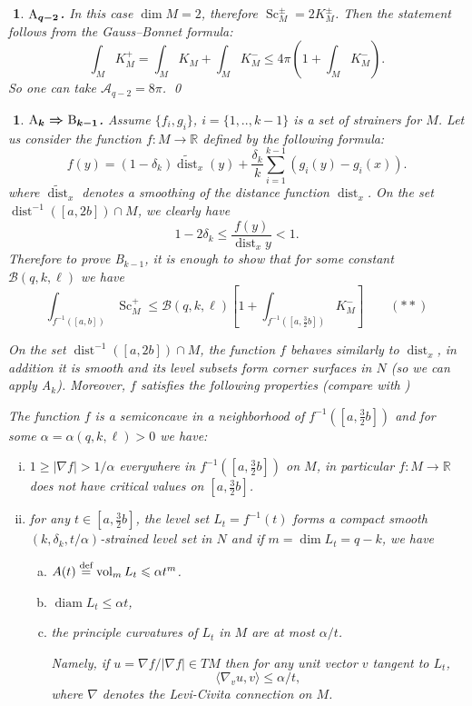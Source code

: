 \documentclass{article}
\def\RR{\mathbb{R}}
\def\cA{{\mathcal A}}
\def\cB{{\mathcal B}}
\def\ge{\geqslant}
\def\le{\leqslant}
\def\l{\left}
\def\r{\right}
\def\<{\langle}
\def\>{\rangle}
\def\vol{\operatorname{vol}}
\def\diam{\operatorname{diam}}
\def\dim{\operatorname{dim}}
\def\dist{\operatorname{dist}}
\def\Sc{\operatorname{Sc}}
\newtheorem{Nothing}[thm]{$\!\!\!$}
\newenvironment{nothing}{\begin{Nothing}\rm}{\end{Nothing}}
\begin{document}
\begin{nothing}{\bf $\boldmath{\text{A}_{q-2}}$.}
In this case $\dim M=2$, therefore $\Sc_M^\pm=2K_M^\pm$.
Then the statement follows from the Gauss--Bonnet formula:
$$\int_M K_M^+=\int_M K_M+ \int_M K_M^-\le 4\pi\l(1+\int_M K_M^-\r).$$
So one can take $\cA_{q-2}=8\pi$.
\qed
\end{nothing}

\begin{nothing}{\bf$\boldmath{\text{A}_{k}\Rightarrow\text{B}_{k-1}}$.} Assume $\{f_i,g_i\}$, $i=\{1,..,k-1\}$ is a set of strainers for $M$.
Let us consider the function $f:M\to \RR$ defined by the following formula:
$$f(y)=(1-\delta_k)\widetilde{\dist}_x(y)
+
\frac{\delta_k}k \sum_{i=1}^{k-1}(g_i(y)-g_i(x)).$$
where $\widetilde{\dist}_x$ denotes a smoothing of the distance function ${\dist}_x$.
On the set $\dist^{-1}([a,2b])\cap M$, we clearly have
$$1-2\delta_k\le \frac{f(y)}{\dist_x y} < 1.$$
Therefore to prove B$_{k-1}$, it is enough to show that for some constant $\cB(q,k,\ell)$ we have
$$\int_{f^{-1}([a,b])}\Sc^+_{M}
\le \cB(q,k,\ell)\l[1+\int_{f^{-1}([a,\tfrac32b])}K^-_{M}\r] \qquad (**)$$

On the set $\dist^{-1}([a,2b])\cap M$, the function $f$ behaves similarly to $\dist_x$,
in addition it is smooth and its level subsets form corner surfaces in $N$
(so we can apply A$_k$). Moreover,
$f$ satisfies the following properties (compare with \cite[11.8]{BGP})

The function $f$ \label{f-prop}is a semiconcave in a neighborhood of $f^{-1}([a,\tfrac32b])$ and for some $\alpha=\alpha(q,k,\ell)>0$ we have:
\begin{enumerate}[(i)]
\item\label{grad}$1\ge |\nabla f|>1/\alpha$ everywhere in $f^{-1}([a,\tfrac32b])$ on $M$,
in particular
$f:M\to \RR$
does not have critical values on $[a,\tfrac32b]$.
\item\label{geom} for any $t\in [a,\tfrac32b]$, the level set $L_t=f^{-1}(t)$
forms a compact smooth $(k,\delta_{k},t/\alpha)$-strained level set in $N$
and if $m=\dim L_t=q-k$, we have
\begin{enumerate}[a)]
\item $A(t)\buildrel \text{def}\over=\vol_{m} L_t\le \alpha t^{m}$.
\item $\diam L_t\le \alpha t$,
\item the principle curvatures of $L_t$ in $M$ are at most $\alpha/t$.

Namely, if $u=\nabla f/|\nabla f|\in T M$ then for any unit vector $v$ tangent to $L_t$,
$$\<\nabla_v u,v\>\le \alpha/t,$$
where $\nabla$ denotes the Levi-Civita connection on $M$.
\end{enumerate}
\end{enumerate}


\end{nothing}
\end{document}

